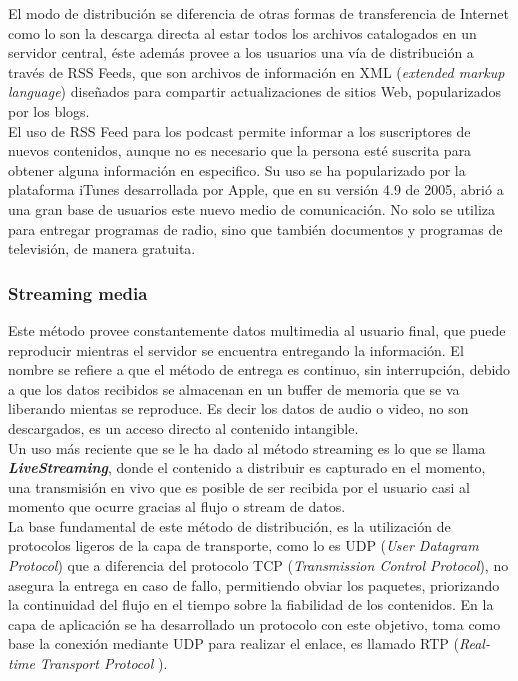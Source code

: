 El modo de distribución se diferencia de otras formas de transferencia de Internet como lo son la descarga directa al estar todos los archivos catalogados en un servidor central, éste además provee a los usuarios una vía de distribución a través de RSS Feeds, que son archivos de información en XML (\textit{extended markup language}) diseñados para compartir actualizaciones de sitios Web, popularizados por los blogs.\\ 
El uso de RSS Feed para los podcast permite informar a los suscriptores de nuevos contenidos, aunque no es necesario que la persona esté suscrita para obtener alguna información en especifico. 
Su uso se ha popularizado por la plataforma iTunes desarrollada por Apple, que en su versión 4.9 de 2005, abrió a una gran base de usuarios este nuevo medio de comunicación. No solo se utiliza para entregar programas de radio, sino que también documentos y programas de televisión, de manera gratuita.\\

\subsubsection{Streaming media}
Este método provee constantemente datos multimedia al usuario final, que puede reproducir mientras el servidor se encuentra entregando la información.
El nombre se refiere a que el método de entrega es continuo, sin interrupción, debido a que los datos recibidos se almacenan en un buffer de memoria que se va liberando mientas se reproduce. Es decir los datos de audio o video, no son descargados,  es un acceso directo al contenido intangible.\\

Un uso más reciente que se le ha dado al método streaming es lo que se llama \textbf{\textit{LiveStreaming}}, donde el contenido a distribuir es capturado en el momento, una transmisión en vivo que es posible de ser recibida por el usuario casi al momento que ocurre gracias al flujo o stream de datos.\\

La base fundamental de este método de distribución, es la utilización de protocolos ligeros de la capa de transporte, como lo es UDP (\textit{User Datagram Protocol}) que a diferencia del protocolo TCP (\textit{Transmission Control Protocol}), no asegura la entrega en caso de fallo, permitiendo obviar los paquetes, priorizando la continuidad del flujo en el tiempo sobre la fiabilidad de los contenidos.  En la capa de aplicación se ha desarrollado un protocolo con este objetivo, toma como base la conexión mediante UDP para realizar el enlace, es llamado RTP (\textit{Real-time Transport Protocol} \cite{sota:rtp-draft}).\\

